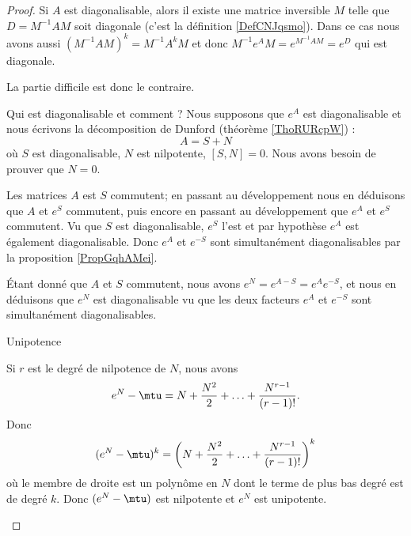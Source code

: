 \begin{proof}
    Si \( A\) est diagonalisable, alors il existe une matrice inversible \( M\) telle que \( D=M^{-1}AM\) soit diagonale (c'est la définition \ref{DefCNJqsmo}). Dans ce cas nous avons aussi \( (M^{-1}AM)^k=M^{-1}A^kM\) et donc \( M^{-1}e^AM=e^{M^{-1}AM}=e^D\) qui est diagonale.

    La partie difficile est donc le contraire. 
    
    \begin{subproof}
        \item[Qui est diagonalisable et comment ?]
            Nous supposons que \( e^A\) est diagonalisable et nous écrivons la décomposition de Dunford (théorème \ref{ThoRURcpW}) :
            \begin{equation}
                A=S+N
            \end{equation}
            où \( S\) est diagonalisable, \( N\) est nilpotente, \( [S,N]=0\). Nous avons besoin de prouver que \( N=0\).
    
            Les matrices \( A\) est \( S\) commutent; en passant au développement nous en déduisons que \( A\) et \( e^S\) commutent, puis encore en passant au développement que \( e^A\) et \( e^S\) commutent. Vu que \( S\) est diagonalisable, \( e^S\) l'est et par hypothèse \( e^A\) est également diagonalisable. Donc \( e^A\) et \( e^{-S}\) sont simultanément diagonalisables par la proposition \ref{PropGqhAMei}.

            Étant donné que \( A\) et \( S\) commutent, nous avons \( e^N=e^{A-S}=e^Ae^{-S}\), et nous en déduisons que \( e^N\) est diagonalisable vu que les deux facteurs \( e^A\) et \( e^{-S}\) sont simultanément diagonalisables.

        \item[Unipotence]

            Si \( r\) est le degré de nilpotence de \( N\), nous avons
            \begin{equation}    \label{EqQHjvLZQ}
                e^N-\mtu=N+\frac{ N^2 }{2}+\ldots +\frac{ N^{r-1} }{ (r-1)! }.
            \end{equation}
            Donc
            \begin{equation}
                (e^N-\mtu)^k=\left( N+\frac{ N^2 }{2}+\ldots +\frac{ N^{r-1} }{ (r-1)! } \right)^k
            \end{equation}
            où le membre de droite est un polynôme en \( N\) dont le terme de plus bas degré est de degré \( k\). Donc \( (e^N-\mtu)\) est nilpotente et \( e^N\) est unipotente.


\end{subproof}
\end{proof}
